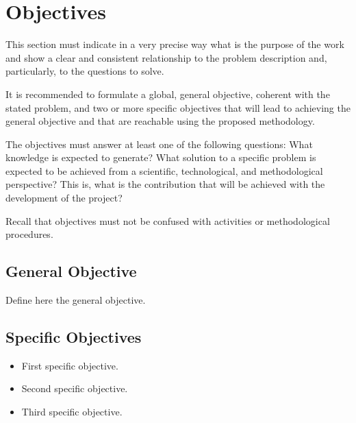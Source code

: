\section{Objectives}
\label{sec:objectives}

This section must indicate in a very precise way what is the purpose of the work and show a clear and consistent relationship to the problem description and, particularly, to the questions to solve.

It is recommended to formulate a global, general objective, coherent with the stated problem, and two or more specific objectives that will lead to achieving the general objective and that are reachable using the proposed methodology.

The objectives must answer at least one of the following questions: What knowledge is expected to generate? What solution to a specific problem is expected to be achieved from a scientific, technological, and methodological perspective? This is, what is the contribution that will be achieved with the development of the project?

Recall that objectives must not be confused with activities or methodological procedures.

\subsection{General Objective}

Define here the general objective.

\subsection{Specific Objectives}

\begin{itemize}
    \item First specific objective.
    
    \item Second specific objective.
    
    \item Third specific objective.
\end{itemize}